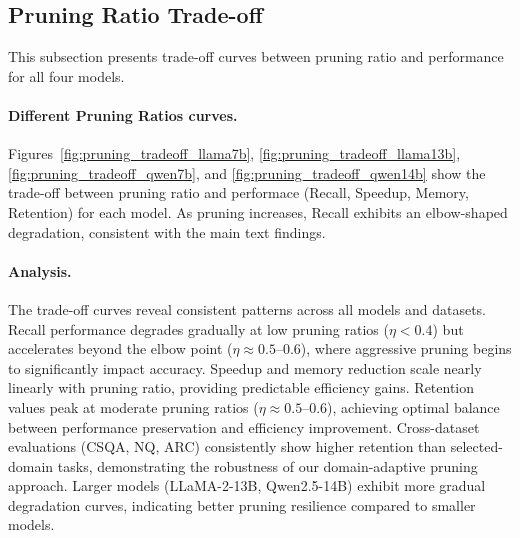 \subsection{Pruning Ratio Trade-off}
\label{app:pruning_ratios}

This subsection presents trade-off curves between pruning ratio and performance for all four models.

\paragraph{Different Pruning Ratios curves.}
Figures~\ref{fig:pruning_tradeoff_llama7b}, \ref{fig:pruning_tradeoff_llama13b}, \ref{fig:pruning_tradeoff_qwen7b}, and \ref{fig:pruning_tradeoff_qwen14b} show the trade-off between pruning ratio and performace (Recall, Speedup, Memory, Retention) for each model.
As pruning increases, Recall exhibits an elbow-shaped degradation, consistent with the main text findings.

\paragraph{Analysis.}
The trade-off curves reveal consistent patterns across all models and datasets.
Recall performance degrades gradually at low pruning ratios ($\eta < 0.4$) but accelerates beyond the elbow point ($\eta \approx 0.5$--$0.6$), where aggressive pruning begins to significantly impact accuracy.
Speedup and memory reduction scale nearly linearly with pruning ratio, providing predictable efficiency gains.
Retention values peak at moderate pruning ratios ($\eta \approx 0.5$--$0.6$), achieving optimal balance between performance preservation and efficiency improvement.
Cross-dataset evaluations (CSQA, NQ, ARC) consistently show higher retention than selected-domain tasks, demonstrating the robustness of our domain-adaptive pruning approach.
Larger models (LLaMA-2-13B, Qwen2.5-14B) exhibit more gradual degradation curves, indicating better pruning resilience compared to smaller models.

